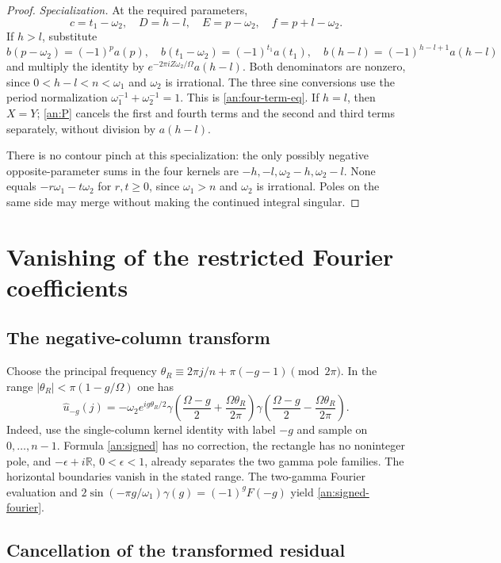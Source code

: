 \documentclass[11pt]{article}
\numberwithin{equation}{section}
\theoremstyle{definition}
\theoremstyle{remark}
\newcommand{\R}{\mathbb R}
\begin{document}
\begin{proof}
\emph{Specialization.}
At the required parameters,
\[
 c=t_1-\omega_2,\quad D=h-l,\quad E=p-\omega_2,\quad f=p+l-\omega_2.
\]
If $h>l$, substitute
\[
 b(p-\omega_2)=(-1)^pa(p),\quad b(t_1-\omega_2)=(-1)^{t_1}a(t_1),\quad
 b(h-l)=(-1)^{h-l+1}a(h-l)
\]
and multiply the identity by $e^{-2\pi iZ\omega_2/\Omega}a(h-l)$.
Both denominators are nonzero, since $0<h-l<n<\omega_1$ and
$\omega_2$ is irrational.  The three sine conversions use the period
normalization $\omega_1^{-1}+\omega_2^{-1}=1$.
This is \eqref{an:four-term-eq}.  If $h=l$, then $X=Y$;
\eqref{an:P} cancels the first and fourth terms and the second
and third terms separately, without division by $a(h-l)$.

There is no contour pinch at this specialization: the only possibly
negative opposite-parameter sums in the four kernels are
$-h,-l,\omega_2-h,\omega_2-l$.  None equals
$-r\omega_1-t\omega_2$ for $r,t\ge0$, since $\omega_1>n$ and
$\omega_2$ is irrational.  Poles on the same side may merge without
making the continued integral singular.
\end{proof}

\section{Vanishing of the restricted Fourier coefficients}
\label{an:vanishing-section}

\subsection{The negative-column transform}

Choose the principal frequency
$\theta_R\equiv2\pi j/n+\pi(-g-1)\pmod{2\pi}$.
In the range $|\theta_R|<\pi(1-g/\Omega)$ one has
\begin{equation}
 \widehat u_{-g}(j)=-\omega_2 e^{ig\theta_R/2}
  \gamma\left(\frac{\Omega-g}{2}+\frac{\Omega\theta_R}{2\pi}\right)
  \gamma\left(\frac{\Omega-g}{2}-\frac{\Omega\theta_R}{2\pi}\right).
 \label{an:signed-fourier}
\end{equation}
Indeed, use the single-column kernel identity with label $-g$ and
sample on $0,\ldots,n-1$.  Formula \eqref{an:signed} has no correction,
the rectangle has no noninteger pole, and
$-\epsilon+i\R$, $0<\epsilon<1$, already separates the
two gamma pole families.  The horizontal boundaries vanish in the
stated range.  The two-gamma Fourier evaluation and
$2\sin(-\pi g/\omega_1)\gamma(g)=(-1)^gF(-g)$ yield
\eqref{an:signed-fourier}.

\subsection{Cancellation of the transformed residual}
\end{document}
